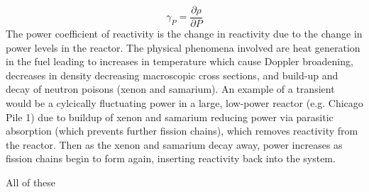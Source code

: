 \documentclass[11pt,addpoints,answers]{exam}
\begin{document}
\begin{questions}
\begin{solution}
\begin{itemize}
                    \begin{equation}
                        \gamma_{P} = \frac{\partial \rho}{\partial P}
                    \end{equation}
                    The power coefficient of reactivity is the
                    change in reactivity due to the change in power levels in
                    the reactor. The physical phenomena involved are heat
                    generation in the fuel leading to increases in temperature
                    which cause Doppler broadening, decreases in
                    density decreasing macroscopic cross sections, and build-up
                    and decay of neutron poisons (xenon and samarium). An example of a
                    transient would be a cylcically fluctuating power in a large,
                    low-power reactor (e.g. Chicago Pile 1) due to buildup of
                    xenon and samarium reducing power via parasitic absorption
                    (which prevents further fission chains), which removes
                    reactivity from the reactor. Then as the xenon
                    and samarium decay away, power increases as fission chains
                    begin to form again, inserting reactivity back into the
                    system.
            \end{itemize}
            All of these 
        \end{solution}
\end{questions}



%
%
\end{document}
